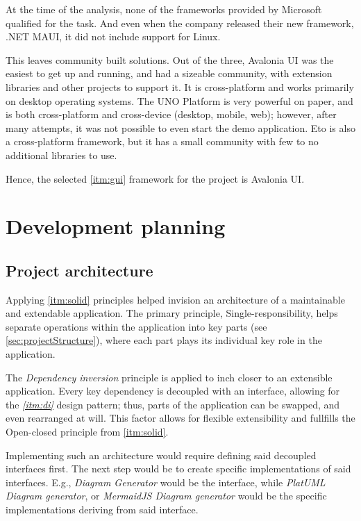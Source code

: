 At the time of the analysis, none of the frameworks provided by Microsoft qualified for the task. And even when the company released their new framework, .NET MAUI, it did not include support for Linux.

This leaves community built solutions.
Out of the three, Avalonia UI was the easiest to get up and running, and had a sizeable community, with extension libraries and other projects to support it. It is cross-platform and works primarily on desktop operating systems. The UNO Platform is very powerful on paper, and is both cross-platform and cross-device (desktop, mobile, web); however, after many attempts, it was not possible to even start the demo application. Eto is also a cross-platform framework, but it has a small community with few to no additional libraries to use.

Hence, the selected \ref{itm:gui} framework for the project is Avalonia UI.

\section{Development planning}

\subsection{Project architecture}

Applying \ref{itm:solid} principles helped invision an architecture of a maintainable and extendable application.
The primary principle, Single-responsibility, helps separate operations within the application into key parts (see \ref{sec:projectStructure}), where each part plays its individual key role in the application.

The \textit{Dependency inversion} principle is applied to inch closer to an extensible application. Every key dependency is decoupled with an interface, allowing for the \textit{\ref{itm:di}} design pattern; thus, parts of the application can be swapped, and even rearranged at will. This factor allows for flexible extensibility and fullfills the Open-closed principle from \ref{itm:solid}.

Implementing such an architecture would require defining said decoupled interfaces first.
The next step would be to create specific implementations of said interfaces. E.g., \textit{Diagram Generator} would be the interface, while \textit{PlatUML Diagram generator}, or \textit{MermaidJS Diagram generator} would be the specific implementations deriving from said interface.

